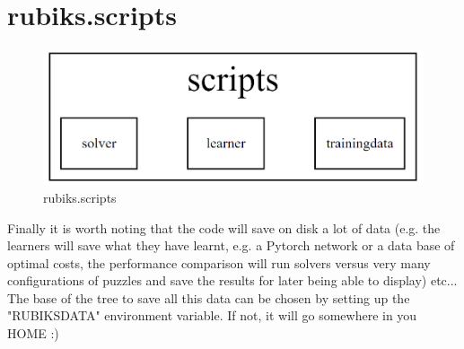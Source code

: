 \section{rubiks.scripts}

\begin{figure}[H]
\centering
\includegraphics[scale=0.25]{./Figures/codebasescripts}
\caption[Codebase]{rubiks.scripts}
\label{fig:Codebasescripts}
\end{figure}

Finally it is worth noting that the code will save on disk a lot of data (e.g. the learners will save what they have learnt, e.g. a Pytorch network or a data base of optimal costs, the performance comparison will run solvers versus very many configurations of puzzles and save the results for later being able to display) etc... The base of the tree to save all this data can be chosen by setting up the "RUBIKSDATA" environment variable. If not, it will go somewhere in you HOME :)
